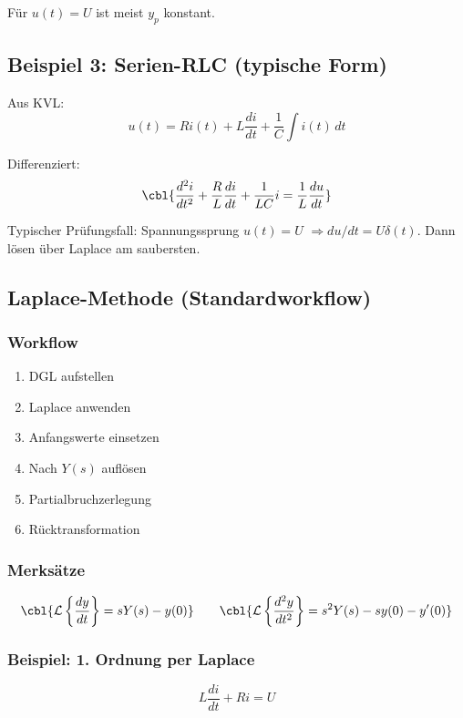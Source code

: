 Für $u(t)=U$ ist meist $y_p$ konstant.

\subsection{Beispiel 3: Serien-RLC (typische Form)}

Aus KVL:
\[
u(t)=Ri(t)+L\frac{di}{dt}+\frac{1}{C}\int i(t)\,dt
\]

Differenziert:
\[
\cbl{\frac{d^2 i}{dt^2} + \frac{R}{L}\frac{di}{dt} + \frac{1}{LC}i = \frac{1}{L}\frac{du}{dt}}
\]

Typischer Prüfungsfall: Spannungssprung $u(t)=U$ $\Rightarrow du/dt = U\delta(t)$.
Dann lösen über Laplace am saubersten.

\subsection{Laplace-Methode (Standardworkflow)}

\subsubsection{Workflow}

\begin{enumerate}
    \item DGL aufstellen
    \item Laplace anwenden
    \item Anfangswerte einsetzen
    \item Nach $Y(s)$ auflösen
    \item Partialbruchzerlegung
    \item Rücktransformation
\end{enumerate}

\subsubsection{Merksätze}

\[
\cbl{\mathcal{L}\left\{\frac{dy}{dt}\right\}=sY(s)-y(0)}
\qquad
\cbl{\mathcal{L}\left\{\frac{d^2y}{dt^2}\right\}=s^2Y(s)-sy(0)-y'(0)}
\]

\subsubsection{Beispiel: 1. Ordnung per Laplace}

\[
L\frac{di}{dt}+Ri=U
\]

